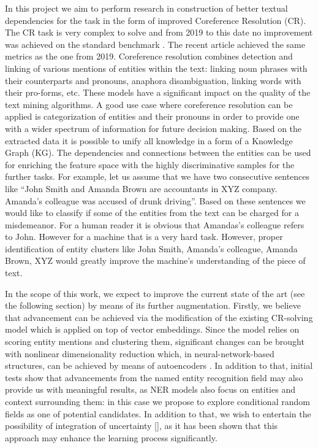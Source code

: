 In this project we aim to perform research in construction of better textual dependencies for the task in the form of improved Coreference Resolution (CR). The CR task is very complex to solve and from 2019 to this date \cite{spanbert-Joshi2020} no improvement was achieved on the standard benchmark \cite{ontonotes5-Weischedel2013}. The recent article \cite{cr-Toshniwal2020} achieved the same metrics as the one from 2019. Coreference resolution combines detection and linking of various mentions of entities within the text: linking noun phrases with their counterparts and pronouns, anaphora disambiguation, linking words with their pro-forms, etc.  These models have a significant impact on the quality of the text mining algorithms. A good use case where  coreference resolution can be applied is categorization of entities and their pronouns in order to provide one with a wider spectrum of information for future decision making. Based on the extracted data it is possible to unify all knowledge in a form of a Knowledge Graph (KG). The dependencies and connections between the entities can be used for enriching the feature space with the highly discriminative samples for the further tasks. 
For example, let us assume that we have two consecutive sentences like “John Smith and Amanda Brown are accountants in XYZ company. Amanda’s colleague was accused of drunk driving”. Based on these sentences we would like to classify if some of the entities from the text can be charged for a misdemeanor. For a human reader it is obvious that Amandas’s colleague refers to John. However for a machine that is a very hard task. However, proper identification of entity clusters like {John Smith, Amanda’s colleague}, {Amanda Brown}, {XYZ} would greatly improve the machine’s understanding of the piece of text.

In the scope of this work, we expect to improve the current state of the art (see the following section) by means of its further augmentation. Firstly, we believe that advancement can be achieved via the modification of the existing CR-solving model which is applied on top of vector embeddings. Since the model relies on scoring entity mentions and clustering them, significant changes can be brought with nonlinear dimensionality reduction which, in neural-network-based structures, can be achieved by means of autoencoders \cite{autoencoders-Zabalza2016,autoencoders-Sahay2019}. In addition to that, initial tests show that advancements from the named entity recognition field may also provide us with meaningful results, as NER models also focus on entities and context surrounding them: in this case we propose to explore conditional random fields \cite{ner-Strakova2019,ner-Zhanming2019} as one of potential candidates. In addition to that, we wish to entertain the possibility of integration of uncertainty [], as it has been shown that this approach may enhance the learning process significantly.

